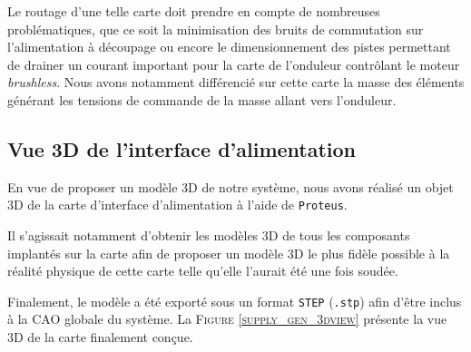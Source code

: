 		Le routage d'une telle carte doit prendre en compte de nombreuses
		problématiques, que ce soit la minimisation des bruits de commutation
		sur l'alimentation à découpage ou encore le dimensionnement des
		pistes permettant de drainer un courant important pour la
		carte de l'onduleur contrôlant le moteur \textit{brushless}. 
		Nous avons notamment différencié sur cette carte la masse des
		éléments générant les tensions de commande de la masse allant
		vers l'onduleur.
		
		\subsection{Vue 3D de l'interface d'alimentation}
		
		En vue de proposer un modèle 3D de notre système, nous
		avons réalisé un objet 3D de la carte d'interface d'alimentation
		à l'aide de \texttt{Proteus}.
		
		Il s'agissait notamment d'obtenir les modèles 3D de tous les
		composants implantés sur la carte afin de proposer un modèle
		3D le plus fidèle possible à la réalité physique de cette carte
		telle qu'elle l'aurait été une fois soudée.
		
		Finalement, le modèle a été exporté sous un format \texttt{STEP} 
		(\texttt{.stp}) afin d'être inclus à la CAO globale du système.
		La \textsc{Figure \ref{supply_gen_3dview}} présente la vue 3D
		de la carte finalement conçue.
		
		\newpage
		

